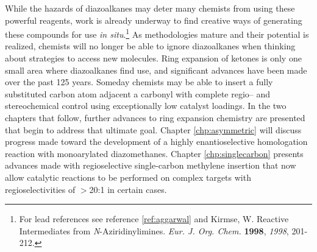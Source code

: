 While the hazards of diazoalkanes may deter many chemists from using these powerful reagents, work
is already underway to find creative ways of generating these compounds for use \textit{in
situ}.\footnote{For lead references see reference \ref{ref:aggarwal} and {\frenchspacing Kirmse, W.
Reactive Intermediates from \textit{N}-Aziridinylimines. \textit{Eur. J. Org. Chem.} \textbf{1998},
\textit{1998}, 201-212.}} As methodologies mature and their potential is realized, chemists will no longer be able to ignore diazoalkanes when thinking about strategies to access new molecules. Ring expansion of ketones is only one small area where diazoalkanes find use, and significant advances have been made over the
past 125 years. Someday chemists may be able to insert a fully substituted carbon atom adjacent a
carbonyl with complete regio-- and stereochemical control using exceptionally low catalyst loadings.
In the two chapters that follow, further advances to ring expansion chemistry are presented that begin
to address that ultimate goal. Chapter \ref{chp:asymmetric} will discuss progress made toward the
development of a highly enantioselective homologation reaction with monoarylated diazomethanes.
Chapter \ref{chp:singlecarbon} presents advances made with regioselective single-carbon methylene
insertion that now allow catalytic reactions to be performed on complex targets with
regioselectivities of $>$20:1 in certain cases.
\pagebreak
